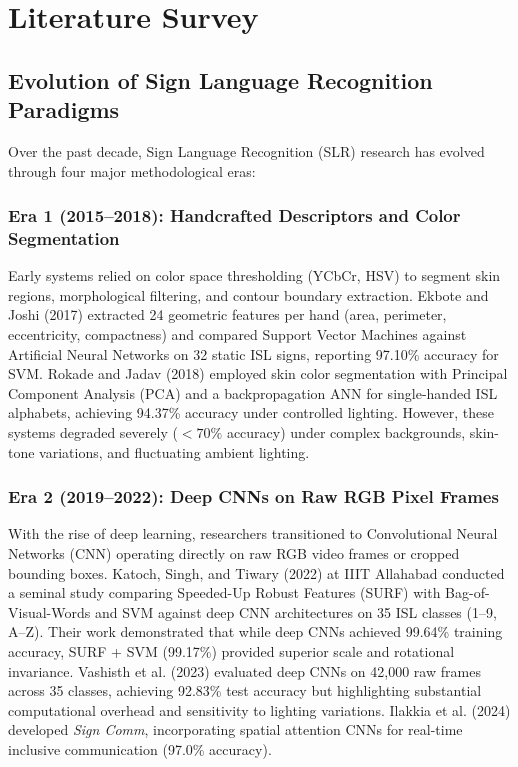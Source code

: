 
\chapter{Literature Survey}
\label{Chapter2}

\section{Evolution of Sign Language Recognition Paradigms}
Over the past decade, Sign Language Recognition (SLR) research has evolved through four major methodological eras:

\subsection{Era 1 (2015--2018): Handcrafted Descriptors and Color Segmentation}
Early systems relied on color space thresholding (YCbCr, HSV) to segment skin regions, morphological filtering, and contour boundary extraction. Ekbote and Joshi (2017) \cite{ekbote2017} extracted 24 geometric features per hand (area, perimeter, eccentricity, compactness) and compared Support Vector Machines against Artificial Neural Networks on 32 static ISL signs, reporting 97.10\% accuracy for SVM. Rokade and Jadav (2018) \cite{rokade2018} employed skin color segmentation with Principal Component Analysis (PCA) and a backpropagation ANN for single-handed ISL alphabets, achieving 94.37\% accuracy under controlled lighting. However, these systems degraded severely ($<70\%$ accuracy) under complex backgrounds, skin-tone variations, and fluctuating ambient lighting.

\subsection{Era 2 (2019--2022): Deep CNNs on Raw RGB Pixel Frames}
With the rise of deep learning, researchers transitioned to Convolutional Neural Networks (CNN) operating directly on raw RGB video frames or cropped bounding boxes. Katoch, Singh, and Tiwary (2022) \cite{katoch2022} at IIIT Allahabad conducted a seminal study comparing Speeded-Up Robust Features (SURF) with Bag-of-Visual-Words and SVM against deep CNN architectures on 35 ISL classes (1--9, A--Z). Their work demonstrated that while deep CNNs achieved 99.64\% training accuracy, SURF + SVM (99.17\%) provided superior scale and rotational invariance. Vashisth et al. (2023) \cite{vashisth2023} evaluated deep CNNs on 42,000 raw frames across 35 classes, achieving 92.83\% test accuracy but highlighting substantial computational overhead and sensitivity to lighting variations. Ilakkia et al. (2024) \cite{ilakkia2024} developed \emph{Sign Comm}, incorporating spatial attention CNNs for real-time inclusive communication (97.0\% accuracy).

